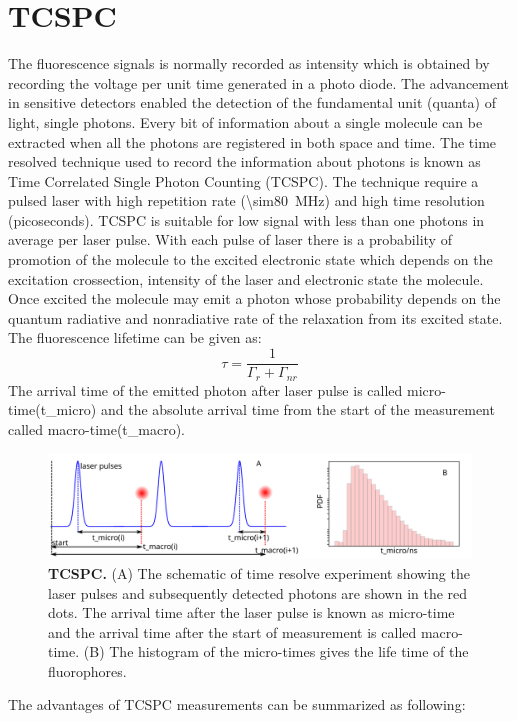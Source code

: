 \section{TCSPC}
The fluorescence signals is normally recorded as intensity which is obtained by recording the voltage per unit time generated in a photo diode.
The advancement in sensitive detectors enabled the detection of the fundamental unit (quanta) of light, single photons.
Every bit of information about a single molecule can be extracted when all the photons are registered in both space and time.
The time resolved technique used to record the information about photons is known as Time Correlated Single Photon Counting (TCSPC).
The technique require a pulsed laser with high repetition rate (\SI{\sim80}{\MHz}) and high time resolution (picoseconds).
TCSPC is suitable for low signal with less than one photons in average per laser pulse.
With each pulse of laser there is a probability of promotion of the molecule to the excited electronic state which depends on the excitation crossection, intensity of the laser and electronic state the molecule.
Once excited the molecule may emit a photon whose probability depends on the quantum radiative and nonradiative rate of the relaxation from its excited state.
The fluorescence lifetime can be given as:
\begin{equation}
	\tau = \frac{1}{\Gamma_{r} + \Gamma_{nr}}
\end{equation}
The arrival time of the emitted photon after laser pulse is called micro-time(t\_micro) and the absolute arrival time from the start of the measurement called macro-time(t\_macro).
\begin{figure}
	\centering
	\includegraphics[width=\textwidth]{tcspc_sch}
	\caption{\textbf{TCSPC.} (A) The schematic of time resolve experiment showing the laser pulses and subsequently detected photons are shown in the red dots.
	The arrival time after the laser pulse is known as micro-time and the arrival time after the start of measurement is called macro-time.
	(B) The histogram of the micro-times gives the life time of the fluorophores.}
	\label{fig:tcspc_sch}
\end{figure}
The advantages of TCSPC measurements can be summarized as following:
